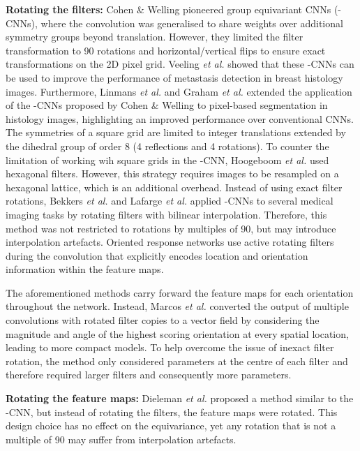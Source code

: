 \documentclass[journal]{IEEEtran}
\begin{document}
\textbf{Rotating the filters: }Cohen \& Welling \cite{cohen2016group} pioneered group equivariant CNNs (-CNNs), where the convolution was generalised to share weights over additional symmetry groups beyond translation. However, they limited the filter transformation to 90 rotations and horizontal/vertical flips to ensure exact transformations on the 2D pixel grid. Veeling \textit{et al.} \cite{veeling2018rotation} showed that these -CNNs can be used to improve the performance of metastasis detection in breast histology images. Furthermore, Linmans \textit{et al.} \cite{linmans2018sample} and Graham \textit{et al.} \cite{graham2019rota} extended the application of the -CNNs proposed by Cohen \& Welling to pixel-based segmentation in histology images, highlighting an improved performance over conventional CNNs. The symmetries of a square grid are limited to integer translations extended by the dihedral group of order 8 (4 reflections and 4 rotations). To counter the limitation of working wih square grids in the -CNN, Hoogeboom \textit{et al.} \cite{hoogeboom2018hexaconv} used hexagonal filters. However, this strategy requires images to be resampled on a hexagonal lattice, which is an additional overhead.
Instead of using exact filter rotations, Bekkers \textit{et al.} \cite{bekkers2018roto} and Lafarge \textit{et al.} \cite{lafarge2020roto} applied -CNNs to several medical imaging tasks by rotating filters with bilinear interpolation. Therefore, this method was not restricted to rotations by multiples of 90, but may introduce interpolation artefacts. Oriented response networks \cite{zhou2017oriented} use active rotating filters during the convolution that explicitly encodes location and orientation information within the feature maps. 

The aforementioned methods carry forward the feature maps for each orientation throughout the network. Instead, Marcos \textit{et al.} \cite{marcos2017rotation} converted the output of multiple convolutions with rotated filter copies to a vector field by considering the magnitude and angle of the highest scoring orientation at every spatial location, leading to more compact models. To help overcome the issue of inexact filter rotation, the method only considered parameters at the centre of each filter and therefore required larger filters and consequently more parameters.

\textbf{Rotating the feature maps: }Dieleman \textit{et al.} proposed a method similar to the -CNN, but instead of rotating the filters, the feature maps were rotated. This design choice has no effect on the equivariance, yet any rotation that is not a multiple of 90 may suffer from interpolation artefacts. 
\end{document}
